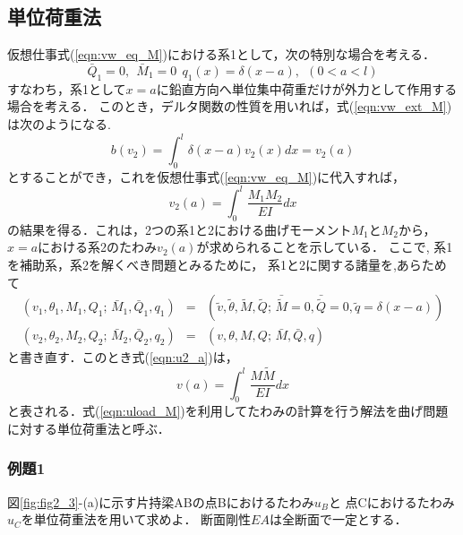 \documentclass[10pt,a4j]{jarticle}
\begin{document}
\subsection{単位荷重法}
仮想仕事式(\ref{eqn:vw_eq_M})における系1として，次の特別な場合を考える．
\begin{equation}
	\bar Q_1=0,\ \ \bar M_1=0\ \ q_1(x)=\delta(x-a), \ \ (0<a<l)
	\label{eqn:sys1_M}
\end{equation}
すなわち，系1として$x=a$に鉛直方向へ単位集中荷重だけが外力として作用する場合を考える．
このとき，デルタ関数の性質を用いれば，式(\ref{eqn:vw_ext_M})は次のようになる. 
\begin{equation}
	b(v_2)=\int_0^l \delta(x-a)v_2(x)dx= v_2(a)
	\label{eqn:vw_eq_dlt}
\end{equation}
とすることができ，これを仮想仕事式(\ref{eqn:vw_eq_M})に代入すれば，
\begin{equation}
	v_2(a)=\int_0^l \frac{M_1M_2}{EI}dx
	\label{eqn:u2_a}
\end{equation}
の結果を得る．これは，2つの系1と2における曲げモーメント$M_1$と$M_2$から，
$x=a$における系2のたわみ$v_2(a)$が求められることを示している．
ここで, 系1を補助系，系2を解くべき問題とみるために，
系1と2に関する諸量を,あらためて 
\begin{eqnarray}
	\left( v_1, \theta_1, M_1, Q_1;\, \bar M_1, \bar Q_1, q_1 \right)& = &
		\left(\tilde v, \tilde \theta, \tilde M, \tilde Q;\, 
		\bar{\tilde{M}}=0, \bar{\tilde{Q}}=0, \tilde q= \delta(x-a) \right) 
	\label{eqn:aux}
	\\
	\left( v_2, \theta_2, M_2, Q_2 ;\, \bar M_2, \bar Q_2, q_2 \right)& = &
		\left( v,\theta,M, Q;\, \bar M,\bar Q, q \right) 
	\label{eqn:prb_M}
\end{eqnarray}
と書き直す．このとき式(\ref{eqn:u2_a})は，
\begin{equation}
	v(a)=\int_0^l \frac{M \tilde M}{EI}dx
	\label{eqn:uload_M}
\end{equation}
と表される．式(\ref{eqn:uload_M})を利用してたわみの計算を行う解法を曲げ問題に対する単位荷重法と呼ぶ．
\subsubsection{例題1}
図\ref{fig:fig2_3}-(a)に示す片持梁ABの点Bにおけるたわみ$u_B$と
点Cにおけるたわみ$u_C$を単位荷重法を用いて求めよ．
断面剛性$EA$は全断面で一定とする．
\end{document}
